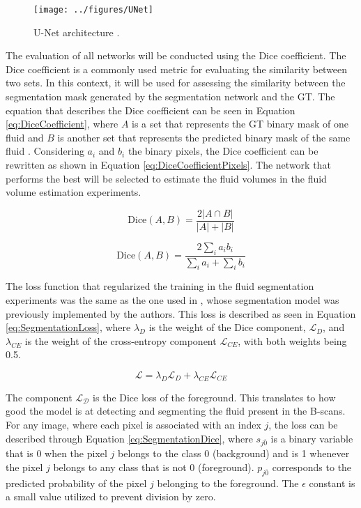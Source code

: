 \begin{figure}[!ht]
	\centering
	\texttt{[image: ../figures/UNet]}
	\caption{U-Net architecture \cite{Ronneberger2015}.}
	\label{fig:UNet}
\end{figure}

The evaluation of all networks will be conducted using the Dice coefficient. The Dice coefficient is a commonly used metric for evaluating the similarity between two sets. In this context, it will be used for assessing the similarity between the segmentation mask generated by the segmentation network and the GT. The equation that describes the Dice coefficient can be seen in Equation \ref{eq:DiceCoefficient}, where $A$ is a set that represents the GT binary mask of one fluid and $B$ is another set that represents the predicted binary mask of the same fluid \cite{Shamir2019}. Considering $a_{i}$ and $b_{i}$ the binary pixels, the Dice coefficient can be rewritten as shown in Equation \ref{eq:DiceCoefficientPixels}. The network that performs the best will be selected to estimate the fluid volumes in the fluid volume estimation experiments.

\begin{equation}
	\text{Dice}(A, B) = \frac{2|A \cap B|}{|A| + |B|}
	\label{eq:DiceCoefficient}
\end{equation}

\begin{equation}
	\text{Dice}(A, B) = \frac{2\sum_{i} a_{i} b_{i}}{\sum_{i} a_{i} + \sum_{i} b_{i}}
	\label{eq:DiceCoefficientPixels}
\end{equation}

The loss function that regularized the training in the fluid segmentation experiments was the same as the one used in \textcite{Tennakoon2018}, whose segmentation model was previously implemented by the authors. This loss is described as seen in Equation \ref{eq:SegmentationLoss}, where $\lambda_{D}$ is the weight of the Dice component, $\mathcal{L}_{D}$, and $\lambda_{CE}$ is the weight of the cross-entropy component $\mathcal{L}_{CE}$, with both weights being 0.5.

\begin{equation}
	\mathcal{L} = \lambda_{D} \mathcal{L}_{D} + \lambda_{CE} \mathcal{L}_{CE}
	\label{eq:SegmentationLoss}
\end{equation}

The component $\mathcal{L_{D}}$ is the Dice loss of the foreground. This translates to how good the model is at detecting and segmenting the fluid present in the B-scans. For any image, where each pixel is associated with an index $j$, the loss can be described through Equation \ref{eq:SegmentationDice}, where $s_{j\overline{0}}$ is a binary variable that is 0 when the pixel $j$ belongs to the class 0 (background) and is 1 whenever the pixel $j$ belongs to any class that is not 0 (foreground). $p_{j\overline{0}}$ corresponds to the predicted probability of the pixel $j$ belonging to the foreground. The $\epsilon$ constant is a small value utilized to prevent division by zero.

